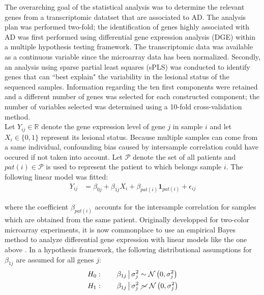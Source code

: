 \documentclass[journal, a4paper]{IEEEtran}
\def\one{\mathbf{1}}
\begin{document}
The overarching goal of the statistical analysis was to determine the relevant genes from a transcriptomic datatset that are associated to AD. The analysis plan was performed two-fold; the identification of genes highly associated with AD was first performed using differential gene expression analysis (DGE) within a multiple hypothesis testing framework. The transcriptomic data was available as a continuous variable since the microarray data has been normalized. Secondly, an analysis using sparse partial least squares (sPLS) was conducted to identify genes that can ``best explain" the variability in the lesional status of the sequenced samples. Information regarding the ten first components were retained and a different number of genes was selected for each constructed component; the number of variables selected was determined using a 10-fold cross-validation method.\\

Let $Y_{ij} \in \mathbb{R}$ denote the gene expression level of gene $j$ in sample $i$ and let $X_i \in \{0, 1\}$ represent its lesional status. Because multiple samples can come from a same individual, confounding bias caused by intersample correlation could have occured if not taken into account. Let $\mathcal{P}$ denote the set of all patients and $pat(i) \in \mathcal{P}$ is used to represent the patient to which belongs sample $i$. The following linear model was fitted:
\begin{align*}
  Y_{ij} &=\beta_{0j} + \beta_{1j}X_i + \beta_{pat(i)}\one_{pat(i)} + \epsilon_{ij}
\end{align*}

\noindent where the coefficient $\beta_{pat(i)}$ accounts for the intersample correlation for samples which are obtained from the same patient. Originally developped for two-color microarray experiments, it is now commonplace to use an empirical Bayes method to analyze differential gene expression with linear models like the one above \cite{smyth2004linear}. In a hypothesis framework, the following distributional assumptions for $\beta_{1j}$ are assumed for all genes $j$:
\begin{align*}
  H_0:\qquad \beta_{1j} \,\big\vert\, \sigma^2_j &\sim \mathcal{N}\left(0, \sigma^2_j\right)\\
  H_1:\qquad \beta_{1j} \,\big\vert\, \sigma^2_j &\,\,\cancel{\sim}\,\, \mathcal{N}\left(0, \sigma^2_j\right)
\end{align*}
\end{document}
